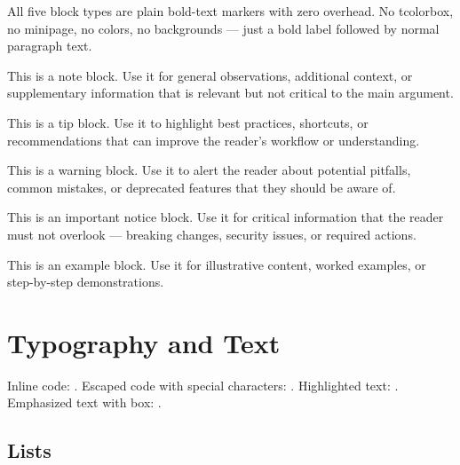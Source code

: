 \documentclass[11pt, a4paper]{article}
\begin{document}
All five block types are plain bold-text markers with zero overhead. No
tcolorbox, no minipage, no colors, no backgrounds --- just a bold label
followed by normal paragraph text.

\begin{noteblock}
  This is a note block. Use it for general observations, additional context,
  or supplementary information that is relevant but not critical to the main
  argument.
\end{noteblock}

\begin{tipblock}
  This is a tip block. Use it to highlight best practices, shortcuts, or
  recommendations that can improve the reader's workflow or understanding.
\end{tipblock}

\begin{warningblock}
  This is a warning block. Use it to alert the reader about potential pitfalls,
  common mistakes, or deprecated features that they should be aware of.
\end{warningblock}

\begin{dangerblock}
  This is an important notice block. Use it for critical information that the
  reader must not overlook --- breaking changes, security issues, or required
  actions.
\end{dangerblock}

\begin{exampleblock}
  This is an example block. Use it for illustrative content, worked examples,
  or step-by-step demonstrations.
\end{exampleblock}


\section{Typography and Text}

Inline code: .
Escaped code with special characters: .
Highlighted text: .
Emphasized text with box: .

\subsection{Lists}
\end{document}
